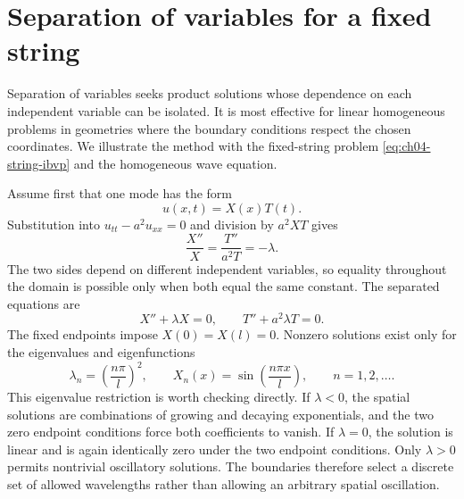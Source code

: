 \section{Separation of variables for a fixed string}

Separation of variables seeks product solutions whose dependence on each independent variable can be isolated. It is most effective for linear homogeneous problems in geometries where the boundary conditions respect the chosen coordinates. We illustrate the method with the fixed-string problem \eqref{eq:ch04-string-ibvp} and the homogeneous wave equation.

Assume first that one mode has the form
\begin{equation}
u(x,t)=X(x)T(t).
\end{equation}
Substitution into $u_{tt}-a^2u_{xx}=0$ and division by $a^2XT$ gives
\begin{equation}
\frac{X''}{X}=\frac{T''}{a^2T}=-\lambda.
\end{equation}
The two sides depend on different independent variables, so equality throughout the domain is possible only when both equal the same constant. The separated equations are
\begin{equation}
X''+\lambda X=0,
\qquad
T''+a^2\lambda T=0.
\end{equation}
The fixed endpoints impose $X(0)=X(l)=0$. Nonzero solutions exist only for the eigenvalues and eigenfunctions
\begin{equation}
\lambda_n=\left(\frac{n\pi}{l}\right)^2,
\qquad
X_n(x)=\sin\left(\frac{n\pi x}{l}\right),
\qquad n=1,2,\ldots.
\end{equation}
This eigenvalue restriction is worth checking directly. If $\lambda<0$, the spatial solutions are combinations of growing and decaying exponentials, and the two zero endpoint conditions force both coefficients to vanish. If $\lambda=0$, the solution is linear and is again identically zero under the two endpoint conditions. Only $\lambda>0$ permits nontrivial oscillatory solutions. The boundaries therefore select a discrete set of allowed wavelengths rather than allowing an arbitrary spatial oscillation.

